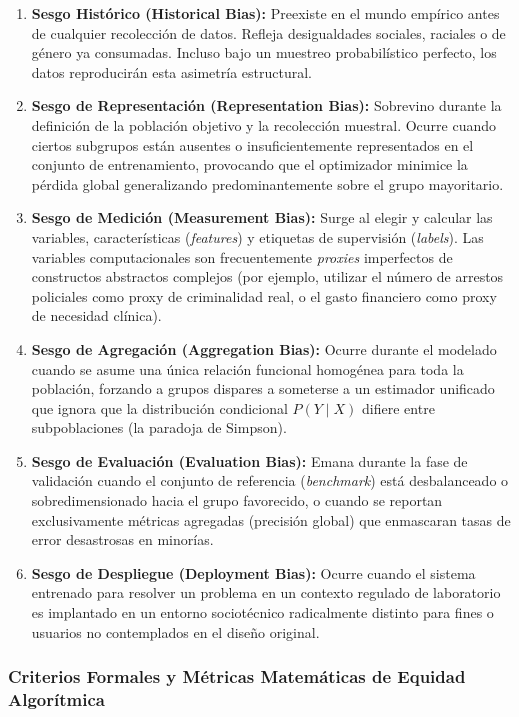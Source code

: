 \begin{enumerate}
    \item \textbf{Sesgo Histórico (Historical Bias):} Preexiste en el mundo empírico antes de cualquier recolección de datos. Refleja desigualdades sociales, raciales o de género ya consumadas. Incluso bajo un muestreo probabilístico perfecto, los datos reproducirán esta asimetría estructural.
    \item \textbf{Sesgo de Representación (Representation Bias):} Sobrevino durante la definición de la población objetivo y la recolección muestral. Ocurre cuando ciertos subgrupos están ausentes o insuficientemente representados en el conjunto de entrenamiento, provocando que el optimizador minimice la pérdida global generalizando predominantemente sobre el grupo mayoritario.
    \item \textbf{Sesgo de Medición (Measurement Bias):} Surge al elegir y calcular las variables, características (\textit{features}) y etiquetas de supervisión (\textit{labels}). Las variables computacionales son frecuentemente \textit{proxies} imperfectos de constructos abstractos complejos (por ejemplo, utilizar el número de arrestos policiales como proxy de criminalidad real, o el gasto financiero como proxy de necesidad clínica).
    \item \textbf{Sesgo de Agregación (Aggregation Bias):} Ocurre durante el modelado cuando se asume una única relación funcional homogénea para toda la población, forzando a grupos dispares a someterse a un estimador unificado que ignora que la distribución condicional $P(Y \mid X)$ difiere entre subpoblaciones (la paradoja de Simpson).
    \item \textbf{Sesgo de Evaluación (Evaluation Bias):} Emana durante la fase de validación cuando el conjunto de referencia (\textit{benchmark}) está desbalanceado o sobredimensionado hacia el grupo favorecido, o cuando se reportan exclusivamente métricas agregadas (precisión global) que enmascaran tasas de error desastrosas en minorías.
    \item \textbf{Sesgo de Despliegue (Deployment Bias):} Ocurre cuando el sistema entrenado para resolver un problema en un contexto regulado de laboratorio es implantado en un entorno sociotécnico radicalmente distinto para fines o usuarios no contemplados en el diseño original.
\end{enumerate}

\subsubsection{Criterios Formales y Métricas Matemáticas de Equidad Algorítmica}

